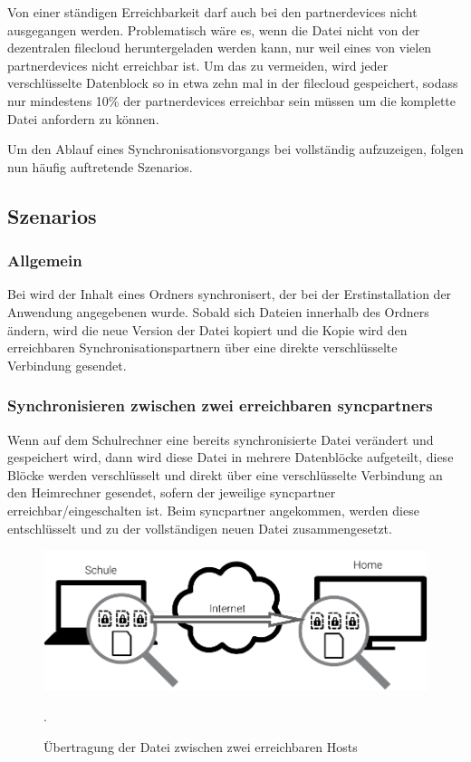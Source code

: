Von einer ständigen Erreichbarkeit darf auch bei den \glspl{partnerdevice} nicht
ausgegangen werden. Problematisch wäre es, wenn die Datei nicht von der dezentralen
\gls{filecloud} heruntergeladen werden kann, nur weil eines von vielen \glspl{partnerdevice}
nicht erreichbar ist. Um das zu vermeiden, wird jeder verschlüsselte Datenblock so in
etwa zehn mal in der \gls{filecloud} gespeichert, sodass nur mindestens 10\% der
\glspl{partnerdevice} erreichbar sein müssen um die komplette Datei anfordern zu können.

Um den Ablauf eines Synchronisationsvorgangs bei \sblit vollständig aufzuzeigen,
folgen nun häufig auftretende Szenarios.

\subsection{Szenarios}
\subsubsection{Allgemein}
Bei \sblit wird der Inhalt eines Ordners synchronisert, der bei der
Erstinstallation der Anwendung angegebenen wurde. Sobald sich Dateien innerhalb des Ordners
ändern, wird die neue Version der Datei kopiert und die Kopie wird den
erreichbaren Synchronisationspartnern über eine direkte verschlüsselte Verbindung
gesendet.

\subsubsection{Synchronisieren zwischen zwei erreichbaren \glspl{syncpartner}}
Wenn auf dem Schulrechner eine bereits synchronisierte Datei verändert und
gespeichert wird, dann wird diese Datei in mehrere Datenblöcke
aufgeteilt, diese Blöcke werden verschlüsselt und direkt über eine verschlüsselte
Verbindung an den Heimrechner gesendet, sofern der jeweilige \gls{syncpartner}
erreichbar/eingeschalten ist. Beim \gls{syncpartner} angekommen, werden diese
entschlüsselt und zu der vollständigen neuen Datei zusammengesetzt.

\begin{figure}[h]
	\centering
  \includegraphics[]{images/sblit_p2p}
  \caption{Übertragung der Datei zwischen zwei erreichbaren Hosts}.
\end{figure}

